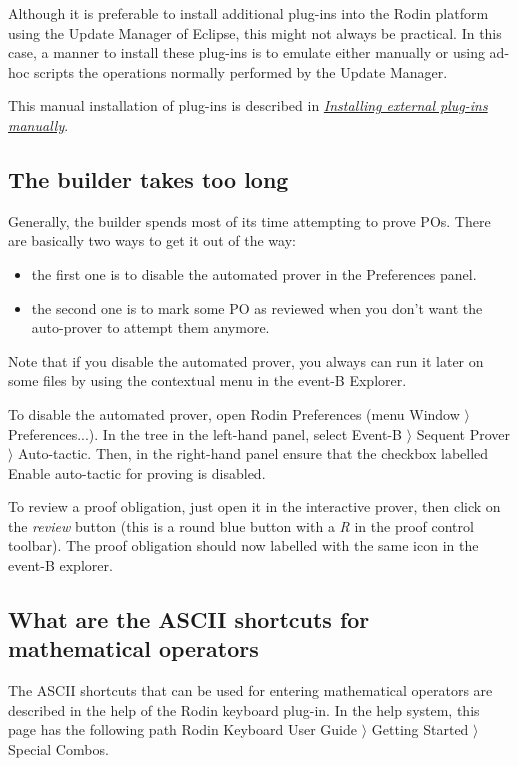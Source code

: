 Although it is preferable to install additional plug-ins into the Rodin platform using the Update Manager of Eclipse, this might not always be practical. In this case, a manner to install these plug-ins is to emulate either manually or using ad-hoc scripts the operations normally performed by the Update Manager. 

This manual installation of plug-ins is described in \href{http://wiki.event-b.org/index.php/Installing_external_plug-ins_manually}{\emph{Installing external plug-ins manually}}. 

\subsection{The builder takes too long}

Generally, the builder spends most of its time attempting to prove POs. There are basically two ways to get it out of the way: 

\begin{itemize}
	\item the first one is to disable the automated prover in the Preferences panel. 
	\item the second one is to mark some PO as reviewed when you don't want the auto-prover to attempt them anymore. 
\end{itemize}

Note that if you disable the automated prover, you always can run it later on some files by using the contextual menu in the event-B Explorer. 

To disable the automated prover, open Rodin Preferences 
(menu \textsf{Window $\rangle$ Preferences...}). In the tree in the left-hand panel, select \textsf{Event-B $\rangle$ Sequent Prover $\rangle$ Auto-tactic}. Then, in the right-hand panel ensure that the checkbox labelled Enable \textsf{auto-tactic} for proving is disabled. 

To review a proof obligation, just open it in the interactive prover, then click on the \emph{review} button (this is a round blue button with a \emph{R} in the proof control toolbar). The proof obligation should now labelled with the same icon in the event-B explorer. 

\subsection{What are the ASCII shortcuts for mathematical operators}

The ASCII shortcuts that can be used for entering mathematical operators are described in the help of the Rodin keyboard plug-in. In the help system, this page has the following path \textsf{Rodin Keyboard User Guide $\rangle$ Getting Started $\rangle$ Special Combos}. 

